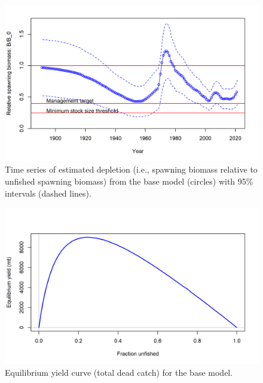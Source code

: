 \documentclass[11pt,
  english,
  a4paper,
]{article}
\begin{document}
\begin{figure}
\centering
\includegraphics[width=1\textwidth,height=0.7\textheight]{figs/ts9_Relative_spawning_biomass_intervals.png}
\caption{Time series of estimated depletion (i.e., spawning biomass relative to unfished spawning biomass) from the base model (circles) with 95\% intervals (dashed lines).\label{fig:ts9}}
\end{figure}

\tagmcend\tagstructend


\begin{figure}
\centering
\includegraphics[width=1\textwidth,height=1\textheight]{figs/yield1_yield_curve.png}
\caption{Equilibrium yield curve (total dead catch) for the base model.\label{fig:yield1}}
\end{figure}

\tagmcend\tagstructend

\end{document}

